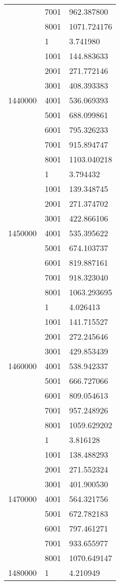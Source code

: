 \begin{table}[htb!]
\begin{tabular}{lll}
 & 7001 & 962.387800 \\
 & 8001 & 1071.724176 \\
\multirow[c]{9}{*}{1440000} & 1 & 3.741980 \\
 & 1001 & 144.883633 \\
 & 2001 & 271.772146 \\
 & 3001 & 408.393383 \\
 & 4001 & 536.069393 \\
 & 5001 & 688.099861 \\
 & 6001 & 795.326233 \\
 & 7001 & 915.894747 \\
 & 8001 & 1103.040218 \\
\multirow[c]{9}{*}{1450000} & 1 & 3.794432 \\
 & 1001 & 139.348745 \\
 & 2001 & 271.374702 \\
 & 3001 & 422.866106 \\
 & 4001 & 535.395622 \\
 & 5001 & 674.103737 \\
 & 6001 & 819.887161 \\
 & 7001 & 918.323040 \\
 & 8001 & 1063.293695 \\
\multirow[c]{9}{*}{1460000} & 1 & 4.026413 \\
 & 1001 & 141.715527 \\
 & 2001 & 272.245646 \\
 & 3001 & 429.853439 \\
 & 4001 & 538.942337 \\
 & 5001 & 666.727066 \\
 & 6001 & 809.054613 \\
 & 7001 & 957.248926 \\
 & 8001 & 1059.629202 \\
\multirow[c]{9}{*}{1470000} & 1 & 3.816128 \\
 & 1001 & 138.488293 \\
 & 2001 & 271.552324 \\
 & 3001 & 401.900530 \\
 & 4001 & 564.321756 \\
 & 5001 & 672.782183 \\
 & 6001 & 797.461271 \\
 & 7001 & 933.655977 \\
 & 8001 & 1070.649147 \\
\multirow[c]{9}{*}{1480000} & 1 & 4.210949 \\

\end{tabular}
\end{table}
